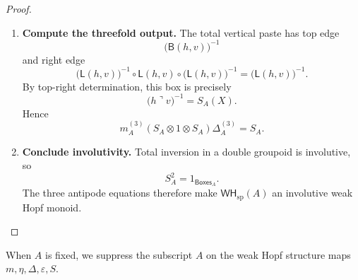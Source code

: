 \documentclass[oneside]{article}
\newcommand{\Boxes}{\mathsf{Boxes}}
\newcommand{\WH}{\mathsf{WH}}
\newcommand{\trcorner}{\mathbin{\urcorner}}
\newcommand{\leftedge}[2]{\mathsf{L}(#1,#2)}
\newcommand{\bottomedge}[2]{\mathsf{B}(#1,#2)}
\theoremstyle{plain}
\theoremstyle{definition}
\theoremstyle{remark}
\begin{document}
\begin{proof}
\begin{enumerate}[beginpenalty=10000]
        \item \textbf{Compute the threefold output.} The total vertical paste has top edge
        \[
            \bigl(\bottomedge{h}{v}\bigr)^{-1}
        \]
        and right edge
        \[
            \bigl(\leftedge{h}{v}\bigr)^{-1}
            \circ
            \leftedge{h}{v}
            \circ
            \bigl(\leftedge{h}{v}\bigr)^{-1}
            =
            \bigl(\leftedge{h}{v}\bigr)^{-1}.
        \]
        By top-right determination, this box is precisely
        \[
            \bigl(h\trcorner v\bigr)^{-1}
            =
            S_A(X).
        \]
        Hence
        \[
            m_A^{(3)}
            (S_A\otimes1\otimes S_A)
            \Delta_A^{(3)}
            =
            S_A.
        \]

        \item \textbf{Conclude involutivity.} Total inversion in a double groupoid is involutive, so
        \[
            S_A^2=1_{\Boxes_A}.
        \]
        The three antipode equations therefore make \(\WH_{\mathrm{sp}}(A)\) an involutive weak Hopf monoid. \qedhere
    \end{enumerate}
\end{proof}

When \(A\) is fixed, we suppress the subscript \(A\) on the weak Hopf structure maps \(m,\eta,\Delta,\varepsilon,S\).
\end{document}
